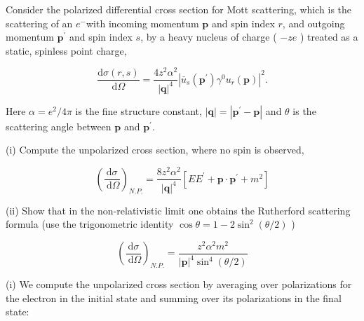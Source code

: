 \documentclass[10pt, letterpaper]{article}
\begin{document}
Consider the polarized differential cross section for Mott scattering, which is the scattering of an $e^{-}$with incoming momentum $\mathbf{p}$ and spin index $r$, and outgoing momentum $\mathbf{p}^{\prime}$ and spin index $s$, by a heavy nucleus of charge ( $-z e$ ) treated as a static, spinless point charge,

$$
\frac{\mathrm{d} \sigma(r, s)}{\mathrm{d} \Omega}=\frac{4 z^2 \alpha^2}{|\mathbf{q}|^4}\left|\bar{u}_s\left(\mathbf{p}^{\prime}\right) \gamma^0 u_r(\mathbf{p})\right|^2 .
$$

Here $\alpha=e^2 / 4 \pi$ is the fine structure constant, $|\mathbf{q}|=\left|\mathbf{p}^{\prime}-\mathbf{p}\right|$ and $\theta$ is the scattering angle between $\mathbf{p}$ and $\mathbf{p}^{\prime}$.

(i) Compute the unpolarized cross section, where no spin is observed,

$$
\left(\frac{\mathrm{d} \sigma}{\mathrm{~d} \Omega}\right)_{N . P .}=\frac{8 z^2 \alpha^2}{|\mathbf{q}|^4}\left[E E^{\prime}+\mathbf{p} \cdot \mathbf{p}^{\prime}+m^2\right]
$$

(ii) Show that in the non-relativistic limit one obtains the Rutherford scattering formula (use the trigonometric identity $\cos \theta=1-2 \sin ^2(\theta / 2)$ )

$$
\left(\frac{\mathrm{d} \sigma}{\mathrm{~d} \Omega}\right)_{N . P .}=\frac{z^2 \alpha^2 m^2}{|\mathbf{p}|^4 \sin ^4(\theta / 2)}
$$



(i) We compute the unpolarized cross section by averaging over polarizations for the electron in the initial state and summing over its polarizations in the final state:
\end{document}
